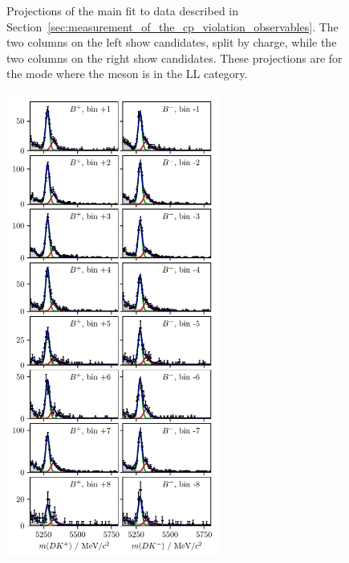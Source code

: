\begin{figure}[tp]
    \caption{Projections of the main fit to data described in Section~\ref{sec:measurement_of_the_cp_violation_observables}. The two columns on the left show \BtoDK candidates, split by charge, while the two columns on the right show \BtoDpi candidates. These projections are for the \DtoKspp mode where the \KS meson is in the LL category.}
\end{figure}

\begin{figure}[tp]
    \centering
    \includegraphics[height=6in]{figures/analysis/bin_by_bin/pretty_fit_bins_dk_LL_2.pdf}

\end{figure}
